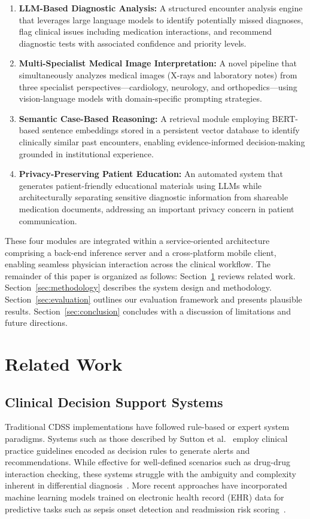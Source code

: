 \documentclass[conference]{IEEEtran}
\begin{document}
\begin{enumerate}
    \item \textbf{LLM-Based Diagnostic Analysis:} A structured encounter analysis engine that leverages large language models to identify potentially missed diagnoses, flag clinical issues including medication interactions, and recommend diagnostic tests with associated confidence and priority levels.
    \item \textbf{Multi-Specialist Medical Image Interpretation:} A novel pipeline that simultaneously analyzes medical images (X-rays and laboratory notes) from three specialist perspectives---cardiology, neurology, and orthopedics---using vision-language models with domain-specific prompting strategies.
    \item \textbf{Semantic Case-Based Reasoning:} A retrieval module employing BERT-based sentence embeddings stored in a persistent vector database to identify clinically similar past encounters, enabling evidence-informed decision-making grounded in institutional experience.
    \item \textbf{Privacy-Preserving Patient Education:} An automated system that generates patient-friendly educational materials using LLMs while architecturally separating sensitive diagnostic information from shareable medication documents, addressing an important privacy concern in patient communication.
\end{enumerate}

These four modules are integrated within a service-oriented architecture comprising a back-end inference server and a cross-platform mobile client, enabling seamless physician interaction across the clinical workflow. The remainder of this paper is organized as follows: Section~\ref{sec:related} reviews related work. Section~\ref{sec:methodology} describes the system design and methodology. Section~\ref{sec:evaluation} outlines our evaluation framework and presents plausible results. Section~\ref{sec:conclusion} concludes with a discussion of limitations and future directions.


\section{Related Work}
\label{sec:related}

\subsection{Clinical Decision Support Systems}
Traditional CDSS implementations have followed rule-based or expert system paradigms. Systems such as those described by Sutton et al.~\cite{b3} employ clinical practice guidelines encoded as decision rules to generate alerts and recommendations. While effective for well-defined scenarios such as drug-drug interaction checking, these systems struggle with the ambiguity and complexity inherent in differential diagnosis~\cite{b4}. More recent approaches have incorporated machine learning models trained on electronic health record (EHR) data for predictive tasks such as sepsis onset detection and readmission risk scoring~\cite{b7}.
\end{document}
